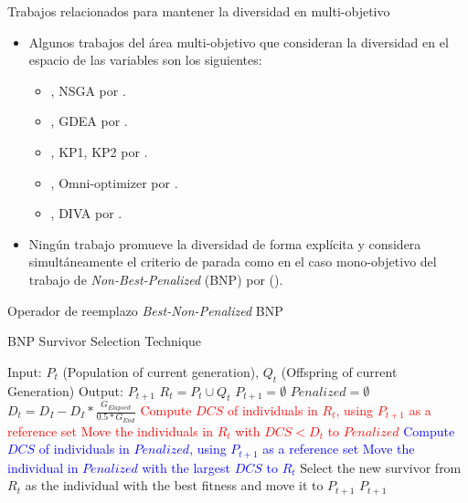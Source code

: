 \documentclass{beamer}
\begin{document}
\begin{frame}{Trabajos relacionados para mantener la diversidad en multi-objetivo}
\begin{itemize}
\scriptsize
    \item Algunos trabajos del área multi-objetivo que consideran la diversidad en el espacio de las variables son los siguientes: \begin{itemize}
	\scriptsize
	\item \citeyear{Joel:NSGA}, NSGA por \citeauthor{Joel:NSGA}.
	\item \citeyear{toffolo2003genetic}, GDEA por \citeauthor{toffolo2003genetic}.
	\item \citeyear{chan2005evolutionary}, KP1, KP2 por \citeauthor{chan2005evolutionary}.
	\item \citeyear{deb2005omni}, Omni-optimizer por \citeauthor{deb2005omni}.
	\item \citeyear{ulrich2010integrating}, DIVA por \citeauthor{ulrich2010integrating}.
    \end{itemize}
   \item Ningún trabajo promueve la diversidad de forma explícita y considera simultáneamente el criterio de parada como en el caso mono-objetivo del trabajo de \textit{Non-Best-Penalized} (BNP) por \citeauthor{romero2018memetic} (\citeyear{romero2018memetic}).
\end{itemize}
\end{frame}



\begin{frame}{Operador de reemplazo \textit{Best-Non-Penalized} BNP}
\begin{algorithm}[H]
\caption{BNP Survivor Selection Technique} 
\begin{scriptsize}
\begin{algorithmic}
\STATE Input: $P_t$ (Population of current generation), $Q_t$ (Offspring of current Generation)
   	\STATE Output: $P_{t+1}$ 
        \STATE $R_t = P_t \cup Q_t$ 
        \STATE $P_{t+1} = \emptyset$ 
        \STATE $Penalized = \emptyset$ 
				\STATE $D_t = D_I - D_I * \frac{G_{Elapsed}}{0.5*G_{End}}$
         \label{alg:6}
					\STATE \textcolor{red}{Compute $DCS$ of individuals in $R_t$, using $P_{t+1}$ as a reference set}
					\STATE \textcolor{red}{Move the individuals in $R_t$ with $DCS < D_t$ to $Penalized$}
        	 \label{alg:9}
						\STATE \textcolor{blue}{ Compute $DCS$ of individuals in $Penalized$, using $P_{t+1}$ as a reference set}
						\STATE \textcolor{blue}{Move the individual in $Penalized$ with the largest $DCS$ to $R_t$}
        	\ENDIF
					\STATE Select the new survivor from $R_t$ as the individual with the best fitness  and move it to $P_{t+1}$
        \ENDWHILE
    	\RETURN $P_{t+1}$ \label{alg:14}
\end{algorithmic}
\end{scriptsize}
\end{algorithm}
\end{frame}
\end{document}
